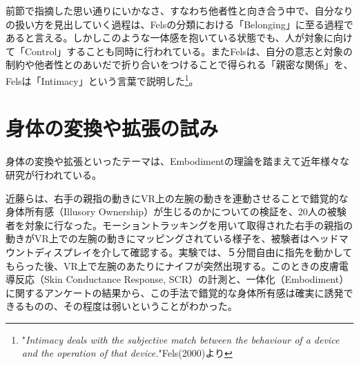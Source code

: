 前節で指摘した思い通りにいかなさ、すなわち他者性と向き合う中で、自分なりの扱い方を見出していく過程は、Felsの分類における「Belonging」に至る過程であると言える。しかしこのような一体感を抱いている状態でも、人が対象に向けて「Control」することも同時に行われている。またFelsは、自分の意志と対象の制約や他者性とのあいだで折り合いをつけることで得られる「親密な関係」を、Felsは「Intimacy」という言葉で説明した\footnote{"\textit{Intimacy deals with the subjective match between the behaviour of a device and the operation of that device.}"Fels(2000)\cite{Fels}より}。

\section{身体の変換や拡張の試み}
身体の変換や拡張といったテーマは、Embodimentの理論を踏まえて近年様々な研究が行われている。


近藤らは、右手の親指の動きにVR上の左腕の動きを連動させることで錯覚的な身体所有感（Illusory Ownership）が生じるのかについての検証を、20人の被験者を対象に行なった\cite{Kondo2020}。モーショントラッキングを用いて取得された右手の親指の動きがVR上での左腕の動きにマッピングされている様子を、被験者はヘッドマウントディスプレイを介して確認する。実験では、５分間自由に指先を動かしてもらった後、VR上で左腕のあたりにナイフが突然出現する。このときの皮膚電導反応（Skin Conductance Response, SCR）の計測と、一体化（Embodiment）に関するアンケートの結果から、この手法で錯覚的な身体所有感は確実に誘発できるものの、その程度は弱いということがわかった。


